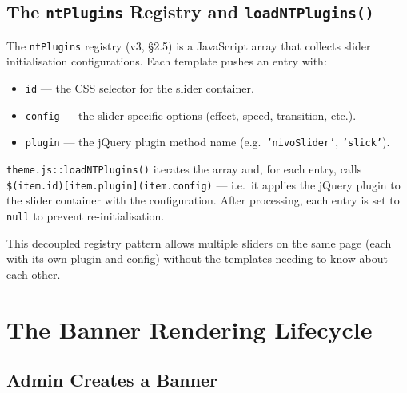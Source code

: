 \documentclass[11pt,a4paper]{article}
\begin{document}
\subsection{The \texttt{ntPlugins} Registry and \texttt{loadNTPlugins()}}

The \texttt{ntPlugins} registry (v3, \S2.5) is a JavaScript array that
collects slider initialisation configurations. Each template pushes an
entry with:
\begin{itemize}[leftmargin=1.6em,itemsep=2pt]
  \item \texttt{id} --- the CSS selector for the slider container.
  \item \texttt{config} --- the slider-specific options (effect,
        speed, transition, etc.).
  \item \texttt{plugin} --- the jQuery plugin method name (e.g.\
        \texttt{'nivoSlider'}, \texttt{'slick'}).
\end{itemize}

\texttt{theme.js::loadNTPlugins()} iterates the array and, for each
entry, calls \texttt{\$(item.id)[item.plugin](item.config)} --- i.e.\
it applies the jQuery plugin to the slider container with the
configuration. After processing, each entry is set to \texttt{null}
to prevent re-initialisation.

This decoupled registry pattern allows multiple sliders on the same
page (each with its own plugin and config) without the templates
needing to know about each other.

\section{The Banner Rendering Lifecycle}\label{sec:trace}

\subsection{Admin Creates a Banner}
\end{document}
